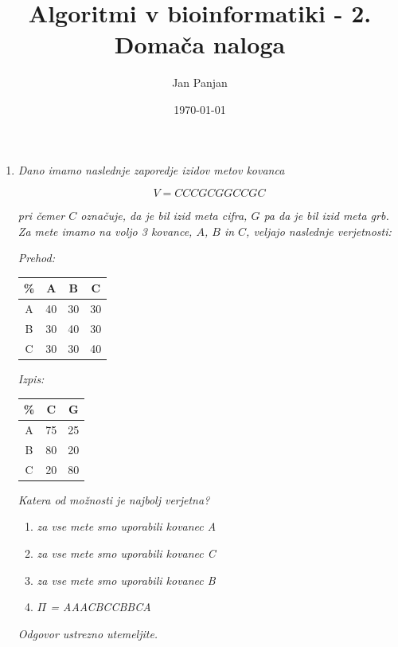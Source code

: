 \documentclass{article}
\title{Algoritmi v bioinformatiki - 2. Domača naloga}
\author{Jan Panjan}
\date{\today}
\begin{document}
\maketitle

\begin{enumerate}
	\item  \textit{Dano imamo naslednje zaporedje izidov metov kovanca}

		$$
		V = CCCGCGGCCGC
		$$

		\textit{pri čemer $C$ označuje, da je bil izid meta cifra, $G$ pa da je bil izid meta grb.
		Za mete imamo na voljo 3 kovance, $A$, $B$ in $C$, veljajo naslednje verjetnosti:}

		\textit{Prehod:}

		\begin{center}
			\begin{tabular}{c||c|c|c}
				\% & A & B & C \\
				\hline
				\hline
				A & 40 & 30 & 30 \\
				\hline
				B & 30 & 40 & 30 \\
				\hline
				C & 30 & 30 & 40 \\
			\end{tabular}
		\end{center}

		\textit{Izpis:}

		\begin{center}
			\begin{tabular}{c||c|c}
				\% & C & G \\
				\hline
				\hline
				A & 75 & 25 \\
				\hline
				B & 80 & 20 \\
				\hline
				C & 20 & 80 \\
			\end{tabular}
		\end{center}

		\textit{Katera od možnosti je najbolj verjetna?}

		\begin{enumerate}
			\item \textit{za vse mete smo uporabili kovanec A}
			\item \textit{za vse mete smo uporabili kovanec C}
			\item \textit{za vse mete smo uporabili kovanec B}
			\item \textit{$\Pi$ = AAACBCCBBCA}
		\end{enumerate}

		\textit{Odgovor ustrezno utemeljite.}


\end{enumerate}
\end{document}
